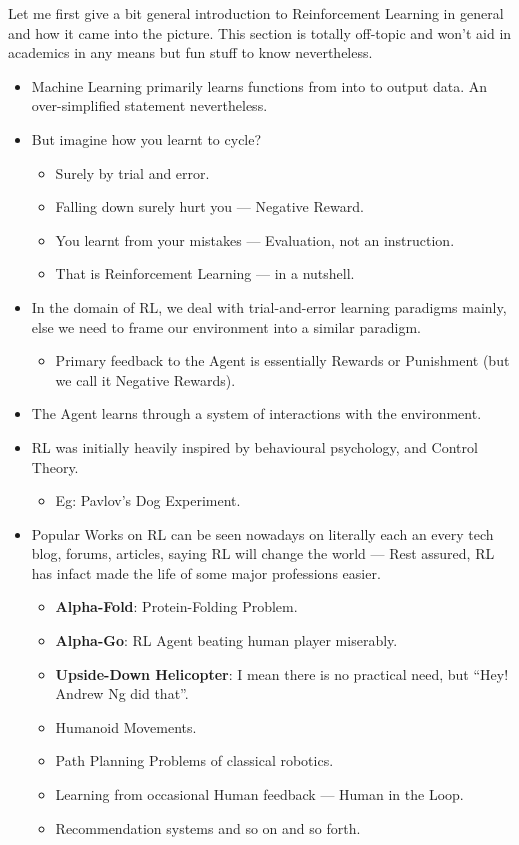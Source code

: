 Let me first give a bit general introduction to Reinforcement Learning in general and how it came into the picture. This section is totally off-topic and won't aid in academics in any means but fun stuff to know nevertheless.

\begin{itemize}[leftmargin=*]
    \item Machine Learning primarily learns functions from into to output data. An over-simplified statement nevertheless.
    \item But imagine how you learnt to cycle?
    \begin{itemize}
        \item Surely by trial and error.
        \item Falling down surely hurt you --- Negative Reward.
        \item You learnt from your mistakes --- Evaluation, not an instruction.
        \item That is Reinforcement Learning --- in a nutshell.
    \end{itemize}
    \item In the domain of RL, we deal with trial-and-error learning paradigms mainly, else we need to frame our environment into a similar paradigm.
    \begin{itemize}
        \item Primary feedback to the Agent is essentially Rewards or Punishment (but we call it Negative Rewards).
    \end{itemize}
    \item The Agent learns through a system of interactions with the environment.
    \item RL was initially heavily inspired by behavioural psychology, and Control Theory.
    \begin{itemize}
        \item Eg: Pavlov's Dog Experiment.
    \end{itemize}
    \item Popular Works on RL can be seen nowadays on literally each an every tech blog, forums, articles, saying RL will change the world --- Rest assured, RL has infact made the life of some major professions easier.
    \begin{itemize}
        \item \textbf{Alpha-Fold}: Protein-Folding Problem.
        \item \textbf{Alpha-Go}: RL Agent beating human player miserably.
        \item \textbf{Upside-Down Helicopter}: I mean there is no practical need, but ``Hey! Andrew Ng did that''.
        \item Humanoid Movements.
        \item Path Planning Problems of classical robotics.
        \item Learning from occasional Human feedback --- Human in the Loop.
        \item Recommendation systems and so on and so forth.
    \end{itemize}
\end{itemize}

